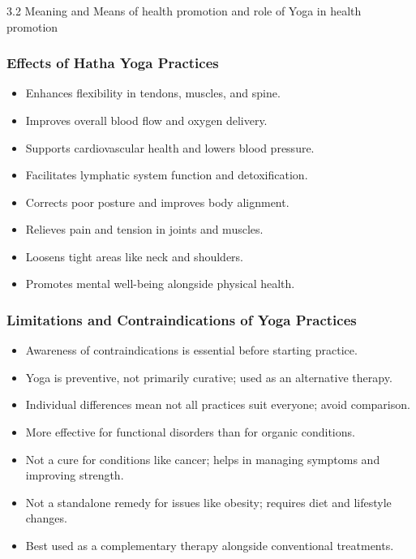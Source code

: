 \begin{frame}[fragile]\frametitle{}
\begin{center}
{\Large 3.2  Meaning and Means of health promotion and role of Yoga  in health promotion}
\end{center}
\end{frame}

\begin{frame}[fragile]\frametitle{Effects of Hatha Yoga Practices}
      \begin{itemize}
        \item Enhances flexibility in tendons, muscles, and spine.
        \item Improves overall blood flow and oxygen delivery.
        \item Supports cardiovascular health and lowers blood pressure.
        \item Facilitates lymphatic system function and detoxification.
        \item Corrects poor posture and improves body alignment.
        \item Relieves pain and tension in joints and muscles.
        \item Loosens tight areas like neck and shoulders.
        \item Promotes mental well-being alongside physical health.
      \end{itemize}
\end{frame}

\begin{frame}[fragile]\frametitle{Limitations and Contraindications of Yoga Practices}
      \begin{itemize}
        \item Awareness of contraindications is essential before starting practice.
        \item Yoga is preventive, not primarily curative; used as an alternative therapy.
        \item Individual differences mean not all practices suit everyone; avoid comparison.
        \item More effective for functional disorders than for organic conditions.
        \item Not a cure for conditions like cancer; helps in managing symptoms and improving strength.
        \item Not a standalone remedy for issues like obesity; requires diet and lifestyle changes.
        \item Best used as a complementary therapy alongside conventional treatments.
      \end{itemize}
\end{frame}



